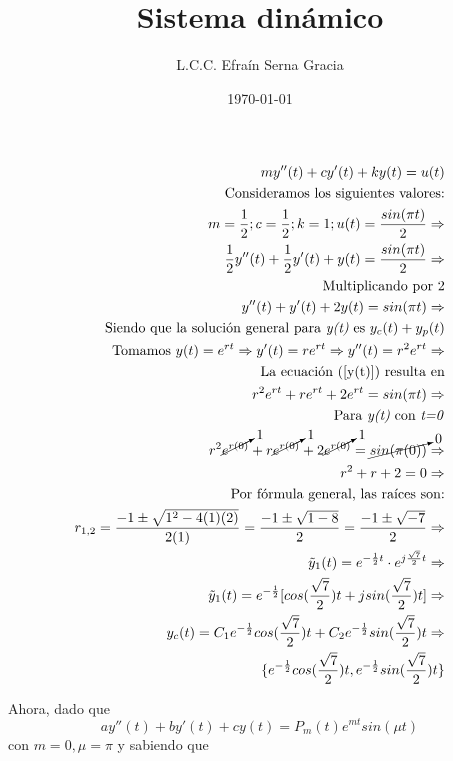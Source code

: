 \documentclass[12pt,spanish,lettersize]{article}
\title{\color{Maroon}Sistema din\'amico}
\author{L.C.C. Efra\'in Serna Gracia}
\date{\color{gray}\today}
\begin{document}
\maketitle
\begin{eqnarray}
my''(t)+cy'(t)+ky(t)=u(t)\\
\nonumber \textrm{Consideramos los siguientes valores:}\\
\nonumber m=\frac{1}{2}; c=\frac{1}{2}; k=1; u(t)=\frac{sin(\pi t)}{2}  \Rightarrow\\
\frac{1}{2}y''(t)+\frac{1}{2}y'(t)+y(t)=\frac{sin(\pi t)}{2}  \Rightarrow\\
\nonumber \textrm{Multiplicando por 2}\\
y''(t)+y'(t)+2y(t)= sin(\pi t)\label{y(t)}  \Rightarrow\\
\nonumber \textrm{Siendo que la soluci\'on general para \emph{y(t)} es } y_c(t)+y_p(t) \\
\nonumber \textrm{Tomamos } y(t) = e^{rt} \Rightarrow y'(t) = re^{rt} \Rightarrow y''(t) = r^2e^{rt} \Rightarrow \\
\nonumber \textrm{La ecuaci\'on (\ref{y(t)}) resulta en} \\
r^2e^{rt}+re^{rt}+2e^{rt}=sin(\pi t) \Rightarrow\\
\nonumber \textrm{Para \emph{y(t)} con \emph{t=0}} \\
\nonumber r^2\cancelto{1}{e^{r(0)}}+r\cancelto{1}{e^{r(0)}}+2\cancelto{1}{e^{r(0)}}=\cancelto{0}{sin(\pi (0))} \Rightarrow\\
r^2+r+2=0 \Rightarrow\\
\nonumber \textrm{Por f\'ormula general, las ra\'ices son:}\\
r_{1,2} = \frac{-1\pm\sqrt{1^2-4(1)(2)}}{2(1)} = \frac{-1\pm\sqrt{1-8}}{2} = \frac{-1\pm\sqrt{-7}}{2} \Rightarrow \\
\tilde{y}_1(t) = e^{-\frac{1}{2}t}\cdot e^{j\frac{\sqrt{7}}{2}t} \Rightarrow \\
\tilde{y}_1(t) = e^{-\frac{1}{2}}[cos(\frac{\sqrt{7}}{2})t+jsin(\frac{\sqrt{7}}{2})t] \Rightarrow \\
y_c(t) = C_1e^{-\frac{1}{2}}cos(\frac{\sqrt{7}}{2})t + C_2e^{-\frac{1}{2}}sin(\frac{\sqrt{7}}{2})t \Rightarrow  \\
\{e^{-\frac{1}{2}}cos(\frac{\sqrt{7}}{2})t,e^{-\frac{1}{2}}sin(\frac{\sqrt{7}}{2})t\}
\end{eqnarray}

Ahora, dado que\\
\begin{equation}ay''(t)+by'(t)+cy(t) = P_m(t)e^{mt}sin(\mu t)
\end{equation} con $m=0, \mu=\pi$ y sabiendo que \\
\end{document}

